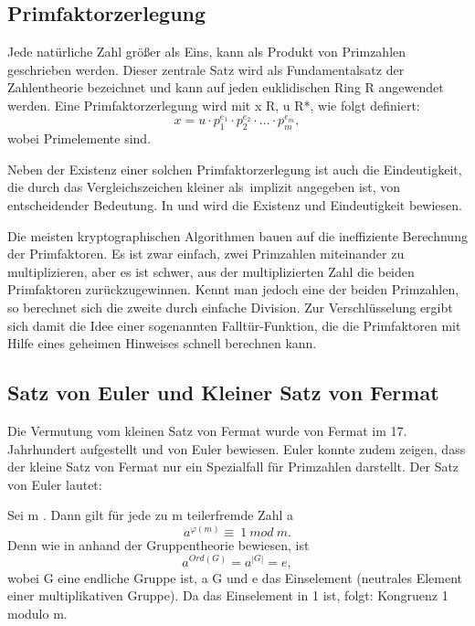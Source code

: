 	\subsection{Primfaktorzerlegung}
	Jede natürliche Zahl größer als Eins, kann als Produkt von Primzahlen geschrieben werden. Dieser zentrale Satz wird als Fundamentalsatz der Zahlentheorie bezeichnet und kann auf jeden euklidischen Ring R angewendet werden. Eine Primfaktorzerlegung wird mit x \myin R, u \myin R*,  \myin {} wie folgt definiert:	
	\begin{displaymath}
		x = u \cdot p^{e_1}_1 \cdot p^{e_2}_2 \cdot . . . \cdot p^{e_m}_m,
	\end{displaymath}
	wobei   Primelemente sind.
	
	Neben der Existenz einer solchen Primfaktorzerlegung ist auch die Eindeutigkeit, die durch das Vergleichszeichen \grqq kleiner als\grqq ~implizit angegeben ist, von entscheidender Bedeutung. In \cite{Einfuehrung:in:Algebra:und:Zahlentheorie} und \cite{Algorithmische:Zahlentheorie} wird die Existenz und Eindeutigkeit bewiesen.

	Die meisten kryptographischen Algorithmen bauen auf die ineffiziente Berechnung der Primfaktoren. Es ist zwar einfach, zwei Primzahlen miteinander zu multiplizieren, aber es ist schwer, aus der multiplizierten Zahl die beiden Primfaktoren zurückzugewinnen. Kennt man jedoch eine der beiden Primzahlen, so berechnet sich die zweite durch einfache Division. Zur Verschlüsselung ergibt sich damit die Idee einer sogenannten Falltür-Funktion, die die Primfaktoren mit Hilfe eines geheimen Hinweises schnell berechnen kann.
		
	\subsection{Satz von Euler und Kleiner Satz von Fermat}
	Die Vermutung vom kleinen Satz von Fermat wurde von Fermat im 17. Jahrhundert aufgestellt und von Euler bewiesen. Euler konnte zudem zeigen, dass der kleine Satz von Fermat nur ein Spezialfall für Primzahlen darstellt. Der Satz von Euler lautet:
	
	Sei m  \myin {}. Dann gilt für jede zu m teilerfremde Zahl a \myin {}
	\begin{displaymath}
		a^{\varphi(m)} \equiv~1~mod~m.
	\end{displaymath}
	Denn wie in \cite{Algorithmische:Zahlentheorie} anhand der Gruppentheorie bewiesen, ist
	\begin{displaymath}
		a^{Ord(G)} = a^{|G|} = e,
	\end{displaymath}
	wobei G eine endliche Gruppe ist, a \myin G und e das Einselement (neutrales Element einer multiplikativen Gruppe). Da das Einselement in  1 ist, folgt: Kongruenz 1 modulo m. 
	
